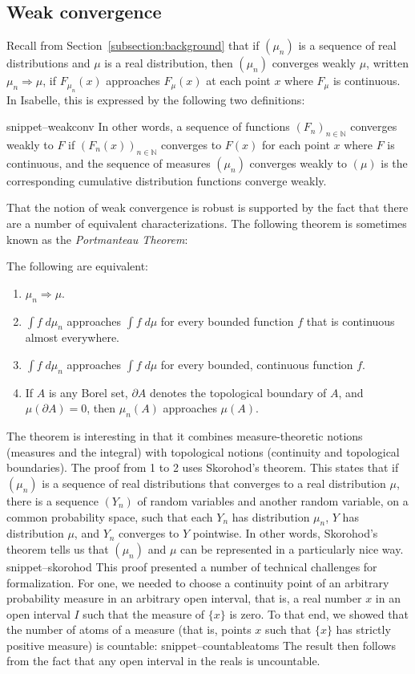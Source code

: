\documentclass{svjour3}
\newcommand{\NN}{\mathbb{N}}
\newcommand{\Snippet}[1]{\csname snippet--#1\endcsname}
\begin{document}
\subsection{Weak convergence}
\label{subsection:weak:convergence}

Recall from Section~\ref{subsection:background} that if $(\mu_n)$ is a sequence of real distributions and $\mu$ is a real distribution, then $(\mu_n)$ converges weakly $\mu$, written $\mu_n \Rightarrow \mu$, if $F_{\mu_n}(x)$ approaches $F_\mu(x)$ at each point $x$ where $F_\mu$ is continuous. In Isabelle, this is expressed by the following two definitions:

\Snippet{weakconv}
In other words, a sequence of functions $(F_n)_{n \in \NN}$ converges weakly to $F$ if $(F_n(x))_{n \in \NN}$ converges to $F(x)$ for each point $x$ where $F$ is continuous, and the sequence of measures $(\mu_n)$ converges weakly to $(\mu)$ is the corresponding cumulative distribution functions converge weakly.

That the notion of weak convergence is robust is supported by the fact that there are a number of equivalent characterizations. The following theorem is sometimes known as the \emph{Portmanteau Theorem}:
\begin{theorem}
The following are equivalent:
\begin{enumerate}
 \item $\mu_n \Rightarrow \mu$.
 \item $\int f \; d\mu_n$ approaches $\int f \; d\mu$ for every bounded function $f$ that is continuous almost everywhere.
 \item $\int f \; d\mu_n$ approaches $\int f \; d\mu$ for every bounded, continuous function $f$.
 \item If $A$ is any Borel set, $\partial A$ denotes the topological boundary of $A$, and $\mu(\partial A) = 0$, then $\mu_n(A)$ approaches $\mu(A)$. 
\end{enumerate}
\end{theorem}
The theorem is interesting in that it combines measure-theoretic notions (measures and the integral) with topological notions (continuity and topological boundaries). The proof from 1 to 2 uses Skorohod's theorem. This states that if $(\mu_n)$ is a sequence of real distributions that converges to a real distribution $\mu$, there is a sequence $(Y_n)$ of random variables and another random variable, on a common probability space, such that each $Y_n$ has distribution $\mu_n$, $Y$ has distribution $\mu$, and $Y_n$ converges to $Y$ pointwise. In other words, Skorohod's theorem tells us that $(\mu_n)$ and $\mu$ can be represented in a particularly nice way. 
\Snippet{skorohod}
This proof presented a number of technical challenges for formalization. For one, we needed to choose a continuity point of an arbitrary probability measure in an arbitrary open interval, that is, a real number $x$ in an open interval $I$ such that the measure of $\{x\}$ is zero. To that end, we showed that the number of atoms of a measure (that is, points $x$ such that $\{x\}$ has strictly positive measure) is countable:
\Snippet{countableatoms}
The result then follows from the fact that any open interval in the reals is uncountable. 
\end{document}

